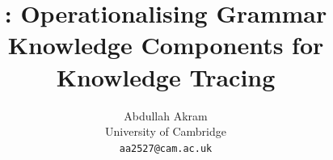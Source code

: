 \documentclass[11pt]{article}
\title{\system: Operationalising Grammar Knowledge Components for
Knowledge Tracing}
\author{Abdullah Akram \\
  University of Cambridge \\
  \texttt{aa2527@cam.ac.uk}}
\begin{document}
\maketitle

\begin{abstract}

\end{abstract}














\appendix

\end{document}
